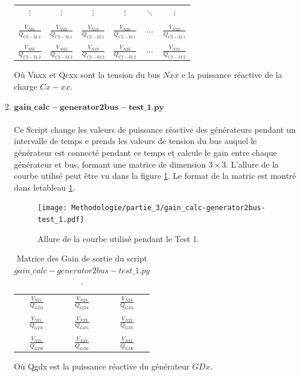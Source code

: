 \begin{enumerate}[\bfseries 4.3.1]
\begin{table}[H]
{\begin{tabular}{cccccc}
				$ \vdots $&$ \vdots $&$ \vdots $&$ \vdots $&$ \ddots $&$ \vdots $\\
				&&&&&\\
				$\frac{V_{N01}}{Q_{C 2-32.1}}$& $\frac{V_{N02}}{Q_{C 2-32.1}}$& $\frac{V_{N19}}{Q_{C 2-32.1}}$& $\frac{V_{N20}}{Q_{C 2-32.1}}$&$\cdots$&$\frac{V_{N32}}{Q_{C 2-32.1}}$\\
				&&&&&\\
				$\frac{V_{N01}}{Q_{C 2-32.2}}$& $\frac{V_{N02}}{Q_{C 2-32.2}}$& $\frac{V_{N19}}{Q_{C 2-32.2}}$& $\frac{V_{N20}}{Q_{C 2-32.2}}$&$\cdots$&$\frac{V_{N32}}{Q_{C 2-32.2}}$\\
		\end{tabular}}		
	\end{table}
	Où \gls{Vnxx}  et \gls{Qcxx} sont la tension du bus $ Nxx $ e la puissance réactive de la charge $ Cx-xx $.
	
	\item $\mathbf{gain\_calc-generator2bus-test\_1.py}$\\
	\\Ce Script change les valeurs de puissance réactive des générateurs pendant un intervalle de temps e prends les valeurs de tension du bus auquel le générateur est connecté pendant ce temps et calcule le gain entre chaque générateur et bus, formant une matrice de dimension $ 3\times3 $. L'allure de la courbe utilisé peut être vu dans la figure \ref{fig:gaincalcgenerator2bustest1}. Le format de la matric est montré dans letableau \ref{tab:gaincalcgenerator2bustest1}.
	\begin{figure}[H]
		\begin{center}	
			\texttt{[image: Methodologie/partie\_3/gain\_calc-generator2bus-test\_1.pdf]}
			\caption{Allure de la courbe utilisé pendant le Test 1.}
			\label{fig:gaincalcgenerator2bustest1}
		\end{center}
	\end{figure}
\begin{table}[H]
	\captionsetup{justification=centering,margin=2cm}
	\caption{Matrice des Gain de sortie du script $gain\_calc-generator2bus-test\_1.py$.}
	\label{tab:gaincalcgenerator2bustest1}
	\centering
	\begin{tabular}{ccc}
		$ \frac{V_{N21}}{Q_{GD4}} $&$ \frac{V_{N29}}{Q_{GD4}} $&$ \frac{V_{N23}}{Q_{GD4}} $\\
		&&\\
		$ \frac{V_{N21}}{Q_{GD5}} $&$ \frac{V_{N29}}{Q_{GD5}} $&$ \frac{V_{N23}}{Q_{GD5}} $\\
		&&\\
		$ \frac{V_{N21}}{Q_{GD6}} $&$ \frac{V_{N29}}{Q_{GD6}} $&$ \frac{V_{N23}}{Q_{GD6}} $\\
	\end{tabular}
\end{table}
Où \gls{Qgdx} est la puissance réactive du générateur $ GDx $.


\end{enumerate}
